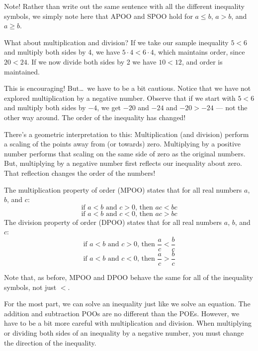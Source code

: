 Note! Rather than write out the same sentence with all the different inequality symbols, we simply note here that APOO and SPOO hold for $a \leq b$, $a>b$, and $a \geq b$. 

What about multiplication and division? If we take our sample inequality $5<6$ and multiply both sides by 4, we have $5\cdot4 < 6\cdot4$, which maintains order, since $20 < 24$. If we now divide both sides by 2 we have $10<12$, and order is maintained.

This is encouraging! But\ldots\ we have to be a bit cautious. Notice that we have not explored multiplication by a negative number. Observe that if we start with $5<6$ and multiply both sides by $-4$, we get $-20$ and $-24$ and $-20 > -24$ --- not the other way around. The order of the inequality has changed!


There's a geometric interpretation to this: Multiplication (and division) perform a scaling of the points away from (or towards) zero. Multiplying by a positive number performs that scaling on the same side of zero as the original numbers. But, multiplying by a negative number first reflects our inequality about zero. That reflection changes the order of the numbers!

\begin{boxdef2col}
The \gls{multiplication property of order} (MPOO) states that for all real numbers $a$, $b$, and $c$:
\[\text{if } a < b \text{ and } c > 0 \text{, then } ac < bc\]
\[\text{if } a < b \text{ and } c < 0 \text{, then } ac > bc\]
\tcblower
The \gls{division property of order} (DPOO) states that for all real numbers $a$, $b$, and $c$:
\[\text{if } a < b \text{ and } c > 0 \text{, then } \frac{a}{c} < \frac{b}{c}\]
\[\text{if } a < b \text{ and } c < 0 \text{, then } \frac{a}{c} > \frac{b}{c}\]
\end{boxdef2col}

Note that, as before, MPOO and DPOO behave the same for all of the inequality symbols, not just $<$.

For the most part, we can solve an inequality just like we solve an equation. The addition and subtraction POOs are no different than the POEs. However, we have to be a bit more careful with multiplication and division. When multiplying or dividing both sides of an inequality by a negative number, you must change the direction of the inequality.

